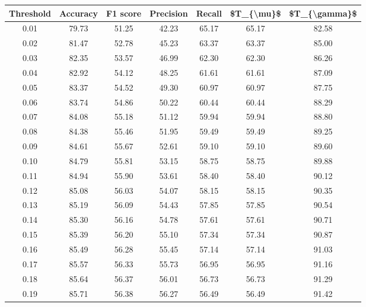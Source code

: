 \begin{tabular}{|c|c|c|c|c|c|c|}
\hline
 Threshold &  Accuracy &  F1 score &  Precision &  Recall &  \$T\_\{\textbackslash mu\}\$ &  \$T\_\{\textbackslash gamma\}\$ \\
\hline
      0.01 &     79.73 &     51.25 &      42.23 &   65.17 &      65.17 &         82.58 \\
      0.02 &     81.47 &     52.78 &      45.23 &   63.37 &      63.37 &         85.00 \\
      0.03 &     82.35 &     53.57 &      46.99 &   62.30 &      62.30 &         86.26 \\
      0.04 &     82.92 &     54.12 &      48.25 &   61.61 &      61.61 &         87.09 \\
      0.05 &     83.37 &     54.52 &      49.30 &   60.97 &      60.97 &         87.75 \\
      0.06 &     83.74 &     54.86 &      50.22 &   60.44 &      60.44 &         88.29 \\
      0.07 &     84.08 &     55.18 &      51.12 &   59.94 &      59.94 &         88.80 \\
      0.08 &     84.38 &     55.46 &      51.95 &   59.49 &      59.49 &         89.25 \\
      0.09 &     84.61 &     55.67 &      52.61 &   59.10 &      59.10 &         89.60 \\
      0.10 &     84.79 &     55.81 &      53.15 &   58.75 &      58.75 &         89.88 \\
      0.11 &     84.94 &     55.90 &      53.61 &   58.40 &      58.40 &         90.12 \\
      0.12 &     85.08 &     56.03 &      54.07 &   58.15 &      58.15 &         90.35 \\
      0.13 &     85.19 &     56.09 &      54.43 &   57.85 &      57.85 &         90.54 \\
      0.14 &     85.30 &     56.16 &      54.78 &   57.61 &      57.61 &         90.71 \\
      0.15 &     85.39 &     56.20 &      55.10 &   57.34 &      57.34 &         90.87 \\
      0.16 &     85.49 &     56.28 &      55.45 &   57.14 &      57.14 &         91.03 \\
      0.17 &     85.57 &     56.33 &      55.73 &   56.95 &      56.95 &         91.16 \\
      0.18 &     85.64 &     56.37 &      56.01 &   56.73 &      56.73 &         91.29 \\
      0.19 &     85.71 &     56.38 &      56.27 &   56.49 &      56.49 &         91.42 \\

\end{tabular}
